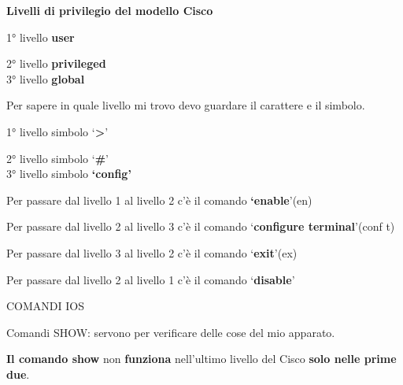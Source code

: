 \textbf{Livelli di privilegio del modello Cisco}

1° livello \textbf{user}

2° livello \textbf{privileged}\\
3° livello \textbf{global}

Per sapere in quale livello mi trovo devo guardare il carattere e il
simbolo.

1° livello simbolo `\textbf{\textgreater{}}'

2° livello simbolo `\textbf{\#}'\\
3° livello simbolo \textbf{`config'}

Per passare dal livello 1 al livello 2 c'è il comando
\textbf{`enable}'(en)

Per passare dal livello 2 al livello 3 c'è il comando `\textbf{configure
terminal}'(conf t)

Per passare dal livello 3 al livello 2 c'è il comando
`\textbf{exit}'(ex)

Per passare dal livello 2 al livello 1 c'è il comando `\textbf{disable}'

COMANDI IOS

Comandi SHOW: servono per verificare delle cose del mio apparato.

\textbf{Il comando show} non \textbf{funziona} nell'ultimo livello del
Cisco \textbf{solo nelle prime due}.

